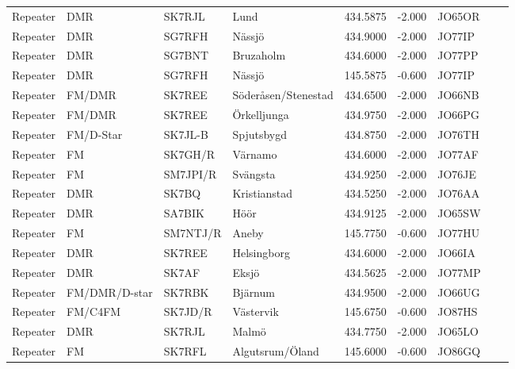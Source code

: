 \begin{longtable}{llllrrlcl}
	Repeater & DMR             & SK7RJL   & Lund                    &   434.5875 &   -2.000 & JO65OR &  &  \\
	Repeater & DMR             & SG7RFH   & Nässjö                  &   434.9000 &   -2.000 & JO77IP &  &  \\
	Repeater & DMR             & SG7BNT   & Bruzaholm               &   434.6000 &   -2.000 & JO77PP &  &  \\
	Repeater & DMR             & SG7RFH   & Nässjö                  &   145.5875 &   -0.600 & JO77IP &  &  \\
	Repeater & FM/DMR          & SK7REE   & Söderåsen/Stenestad     &   434.6500 &   -2.000 & JO66NB &  &  \\
	Repeater & FM/DMR          & SK7REE   & Örkelljunga             &   434.9750 &   -2.000 & JO66PG &  &  \\
	Repeater & FM/D-Star       & SK7JL-B  & Spjutsbygd              &   434.8750 &   -2.000 & JO76TH &  &  \\
	Repeater & FM              & SK7GH/R  & Värnamo                 &   434.6000 &   -2.000 & JO77AF &  &  \\
	Repeater & FM              & SM7JPI/R & Svängsta                &   434.9250 &   -2.000 & JO76JE &  &  \\
	Repeater & DMR             & SK7BQ    & Kristianstad            &   434.5250 &   -2.000 & JO76AA &  &  \\
	Repeater & DMR             & SA7BIK   & Höör                    &   434.9125 &   -2.000 & JO65SW &  &  \\
	Repeater & FM              & SM7NTJ/R & Aneby                   &   145.7750 &   -0.600 & JO77HU &  &  \\
	Repeater & DMR             & SK7REE   & Helsingborg             &   434.6000 &   -2.000 & JO66IA &  &  \\
	Repeater & DMR             & SK7AF    & Eksjö                   &   434.5625 &   -2.000 & JO77MP &  &  \\
	Repeater & FM/DMR/D-star   & SK7RBK   & Bjärnum                 &   434.9500 &   -2.000 & JO66UG &  &  \\
	Repeater & FM/C4FM         & SK7JD/R  & Västervik               &   145.6750 &   -0.600 & JO87HS &  &  \\
	Repeater & DMR             & SK7RJL   & Malmö                   &   434.7750 &   -2.000 & JO65LO &  &  \\
	Repeater & FM              & SK7RFL   & Algutsrum/Öland         &   145.6000 &   -0.600 & JO86GQ &  &  \\

\end{longtable}
